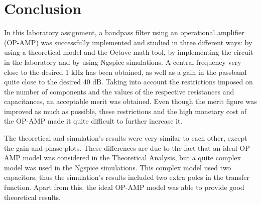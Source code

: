 \section{Conclusion} \label{sec:conclusion}

In this laboratory assignment, a bandpass filter using an operational amplifier (OP-AMP) was successfully implemented and studied in three different ways: by using a theoretical model and the Octave math tool, by implementing the circuit in the laboratory and by using Ngspice simulations. A central frequency very close to the desired 1 kHz has been obtained, as well as a gain in the passband quite close to the desired 40 dB. Taking into account the restrictions imposed on the number of components and the values of the respective resistances and capacitances, an acceptable merit was obtained. Even though the merit figure was improved as much as possible, these restrictions and the high monetary cost of the OP-AMP made it quite difficult to further increase it.
\par
The theoretical and simulation's results were very similar to each other, except the gain and phase plots. These differences are due to the fact that an ideal OP-AMP model was considered in the Theoretical Analysis, but a quite complex model was used in the Ngspice simulations. This complex model used two capacitors, thus the simulation's results included two extra poles in the transfer function. Apart from this, the ideal OP-AMP model was able to provide good theoretical results.
